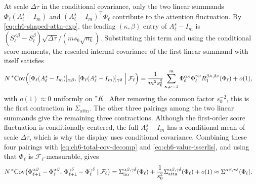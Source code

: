 \begin{proofsketch}
At scale $\Delta\tau$ in the conditional covariance, only the two linear summands $\Phi_\ell(A_\ell^s - I_m)$ and $(A_\ell^s - I_m)^\top \Phi_\ell$ contribute to the attention fluctuation. By \eqref{eq:ch6-shaped-attn-exp}, the leading $(\kappa, \beta)$ entry of $A_\ell^s - I_m$ is $(S_\ell^{\kappa\beta} - \overline{S_\ell^\beta})\sqrt{\Delta\tau}/(m s_0 \sqrt{n_k})$. Substituting this term and using the conditional score moments, the rescaled internal covariance of the first linear summand with itself satisfies
\begin{equation}
\label{eq:ch6-first-attn-pairing}
N\,{}^*\!\operatorname{Cov}\Bigl([\Phi_\ell(A_\ell^s - I_m)]_{\alpha\beta},\, [\Phi_\ell(A_\ell^s - I_m)]_{\gamma\delta} \;\Big|\; \mathcal{F}_\ell\Bigr)
= \frac{1}{m^2 s_0^2}\sum_{\kappa,\nu=1}^m \Phi_\ell^{\alpha\kappa}\Phi_\ell^{\gamma\nu} R_1^{\beta\kappa,\delta\nu}(\Phi_\ell) + o(1),
\end{equation}
with $o(1) \approx 0$ uniformly on ${}^*K$. After removing the common factor $s_0^{-2}$, this is the first contraction in $\Sigma_{\mathrm{attn}}$. The other three pairings among the two linear summands give the remaining three contractions. Although the first-order score fluctuation is conditionally centered, the full $A_\ell^s - I_m$ has a conditional mean of scale $\Delta\tau$, which is why the display uses conditional covariance. Combining these four pairings with \eqref{eq:ch6-total-cov-decomp} and \eqref{eq:ch6-value-isserlis}, and using that $\Phi_\ell$ is $\mathcal{F}_\ell$-measurable, gives
\begin{equation}
\label{eq:ch6-total-rescaled-cov}
N\,{}^*\!\operatorname{Cov}\bigl(\Phi_{\ell+1}^{\alpha\beta} - \Phi_\ell^{\alpha\beta},\, \Phi_{\ell+1}^{\gamma\delta} - \Phi_\ell^{\gamma\delta} \mid \mathcal{F}_\ell\bigr)
= \Sigma_{\mathrm{lin}}^{\alpha\beta,\gamma\delta}(\Phi_\ell) + \frac{1}{s_0^2}\Sigma_{\mathrm{attn}}^{\alpha\beta,\gamma\delta}(\Phi_\ell) + o(1)
\approx \Sigma^{\alpha\beta,\gamma\delta}(\Phi_\ell).
\end{equation}


\end{proofsketch}
